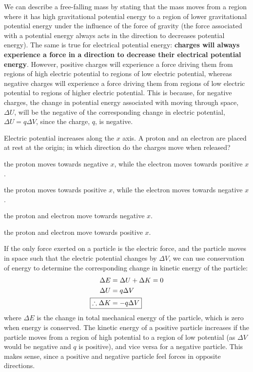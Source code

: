 We can describe a free-falling mass by stating that the mass moves from a region where it has high gravitational potential energy to a region of lower gravitational potential energy under the influence of the force of gravity (the force associated with a potential energy always acts in the direction to decreases potential energy). The same is true for electrical potential energy: \textbf{charges will always experience a force in a direction to decrease their electrical potential energy}. However, positive charges will experience a force driving them from regions of high electric potential to regions of low electric potential, whereas negative charges will experience a force driving them from regions of low electric potential to regions of higher electric potential. This is because, for negative charges, the change in potential energy associated with moving through space, $\Delta U$, will be the negative of the corresponding change in electric potential, $\Delta U=q\Delta V$, since the charge, $q$, is negative. 

\begin{checkpoint}
	\begin{MCquestion}{Electric potential increases along the $x$ axis. A proton and an electron are placed at rest at the origin; in which direction do the charges move when released?}
		\item the proton moves towards negative $x$, while the electron moves towards positive $x$. \correct
		\item the proton moves towards positive $x$, while the electron moves towards negative $x$.
		\item the proton and electron move towards negative $x$.
		\item the proton and electron move towards positive $x$.
	\end{MCquestion}
\end{checkpoint}

If the only force exerted on a particle is the electric force, and the particle moves in space such that the electric potential changes by $\Delta V$, we can use conservation of energy to determine the corresponding change in kinetic energy of the particle:
\begin{align*}
\Delta E &= \Delta U + \Delta K = 0\\
\Delta U &= q\Delta V\\
\Aboxed{\therefore \Delta K &= -q \Delta V}
\end{align*}
where $\Delta E$ is the change in total mechanical energy of the particle, which is zero when energy is conserved. The kinetic energy of a positive particle increases if the particle moves from a region of high potential to a region of low potential (as $\Delta V$ would be negative and $q$ is positive), and vice versa for a negative particle. This makes sense, since a positive and negative particle feel forces in opposite directions.

